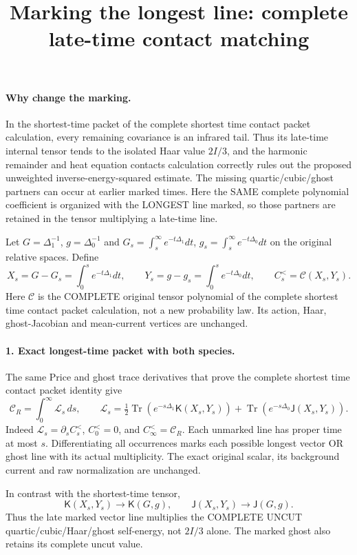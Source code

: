 \documentclass[11pt]{article}
\title{Marking the longest line: complete late-time contact matching}\author{}\date{}
\begin{document}
\maketitle
\paragraph{Why change the marking.}
In the shortest-time packet of the complete shortest time contact packet calculation, every remaining covariance
is an infrared tail. Thus its late-time internal tensor tends to the
isolated Haar value $2I/3$, and the harmonic remainder and heat equation contacts calculation correctly rules out the
proposed unweighted inverse-energy-squared estimate. The missing
quartic/cubic/ghost partners can occur at earlier marked times.
Here the SAME complete polynomial coefficient is organized with the
LONGEST line marked, so those partners are retained in the tensor
multiplying a late-time line.

Let $G=\Delta_1^{-1}$, $g=\Delta_0^{-1}$ and
$G_s=\int_s^\infty e^{-t\Delta_1}dt$,
$g_s=\int_s^\infty e^{-t\Delta_0}dt$ on the original relative spaces.
Define
\[
 X_s=G-G_s=\int_0^s e^{-t\Delta_1}dt,\qquad
 Y_s=g-g_s=\int_0^s e^{-t\Delta_0}dt,\qquad
 C_s^{<}=\mathcal C(X_s,Y_s).                                    \tag{1}
\]
Here $\mathcal C$ is the COMPLETE original tensor polynomial of the complete shortest time contact packet calculation,
not a new probability law. Its action, Haar, ghost-Jacobian and
mean-current vertices are unchanged.

\paragraph{1. Exact longest-time packet with both species.}
The same Price and ghost trace derivatives that prove the complete shortest time contact packet identity give
\[
 \boxed{\mathcal C_R=\int_0^\infty \mathcal L_s\,ds,\qquad
 \mathcal L_s=
 \tfrac12\operatorname{Tr}(e^{-s\Delta_1}\mathsf K(X_s,Y_s))
 +\operatorname{Tr}(e^{-s\Delta_0}\mathsf J(X_s,Y_s)).}            \tag{2}
\]
Indeed $\mathcal L_s=\partial_s C_s^{<}$,
$C_0^{<}=0$, and $C_\infty^{<}=\mathcal C_R$.
Each unmarked line has proper time at most $s$. Differentiating all
occurrences marks each possible longest vector OR ghost line with
its actual multiplicity. The exact original scalar, its background
current and raw normalization are unchanged.

In contrast with the shortest-time tensor,
\[
 \mathsf K(X_s,Y_s)\longrightarrow\mathsf K(G,g),\qquad
 \mathsf J(X_s,Y_s)\longrightarrow\mathsf J(G,g).                 \tag{3}
\]
Thus the late marked vector line multiplies the COMPLETE UNCUT
quartic/cubic/Haar/ghost self-energy, not $2I/3$ alone.
The marked ghost also retains its complete uncut value.
\end{document}
